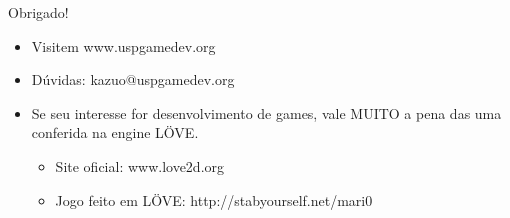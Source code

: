 \documentclass[brazil]{beamer}
\begin{document}
\begin{frame}
  \begin{center}
    \LARGE Obrigado!
  \end{center}
  \begin{itemize}
    \item Visitem www.uspgamedev.org
    \item Dúvidas: kazuo@uspgamedev.org
    \item Se seu interesse for desenvolvimento de games,
          vale MUITO a pena das uma conferida na engine
          LÖVE.
    \begin{itemize}
      \item Site oficial: www.love2d.org
      \item Jogo feito em LÖVE: http://stabyourself.net/mari0
    \end{itemize}
  \end{itemize}
\end{frame}

\end{document}
